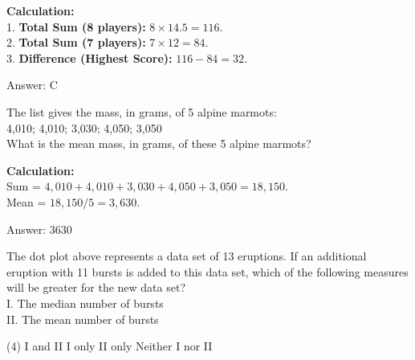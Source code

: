 \documentclass[11pt,paper=a4,answers]{exam}
\begin{document}
\begin{questions}
\begin{solution}
\textbf{Calculation:} \\
1. \textbf{Total Sum (8 players):} $8 \times 14.5 = 116$. \\
2. \textbf{Total Sum (7 players):} $7 \times 12 = 84$. \\
3. \textbf{Difference (Highest Score):} $116 - 84 = 32$.

\vspace{30pt}

Answer: \colorbox{yellow!100}{C}
\end{solution}

\vspace{60pt}

\question
The list gives the mass, in grams, of 5 alpine marmots: \\
4,010; 4,010; 3,030; 4,050; 3,050 \\
What is the mean mass, in grams, of these 5 alpine marmots?

\begin{solution}
\textbf{Calculation:} \\
Sum = $4,010 + 4,010 + 3,030 + 4,050 + 3,050 = 18,150$. \\
Mean = $18,150 / 5 = 3,630$.

\vspace{30pt}

Answer: \colorbox{yellow!100}{3630}
\end{solution}

\vspace{60pt}

\question
\begin{center}
\end{center}
The dot plot above represents a data set of 13 eruptions. If an additional eruption with 11 bursts is added to this data set, which of the following measures will be greater for the new data set? \\
I. The median number of bursts \\
II. The mean number of bursts
\begin{tasks}(4)
    \task I and II
    \task I only
    \task II only
    \task Neither I nor II
\end{tasks}


\end{questions}
\end{document}

